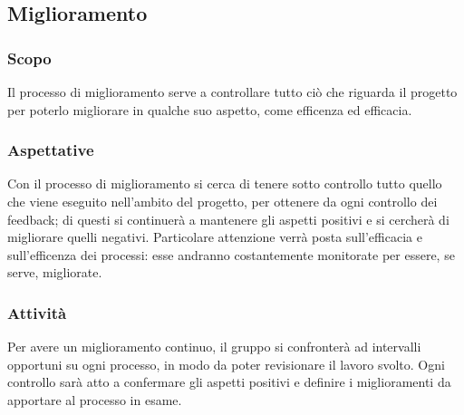 \subsection{Miglioramento}
\subsubsection{Scopo}
Il processo di miglioramento serve a controllare tutto ciò che riguarda il progetto per poterlo migliorare in qualche suo aspetto, come efficenza ed efficacia.
\subsubsection{Aspettative}
Con il processo di miglioramento si cerca di tenere sotto controllo tutto quello che viene eseguito nell'ambito del progetto, per ottenere da ogni controllo dei feedback; di questi si continuerà a mantenere gli aspetti positivi e si cercherà di migliorare quelli negativi. Particolare attenzione verrà posta sull'efficacia e sull'efficenza dei processi: esse andranno costantemente monitorate per essere, se serve, migliorate.
\subsubsection{Attività}
Per avere un miglioramento continuo, il gruppo si confronterà ad intervalli opportuni su ogni processo, in modo da poter revisionare il lavoro svolto. Ogni controllo sarà atto a confermare gli aspetti positivi e definire i miglioramenti da apportare al processo in esame.